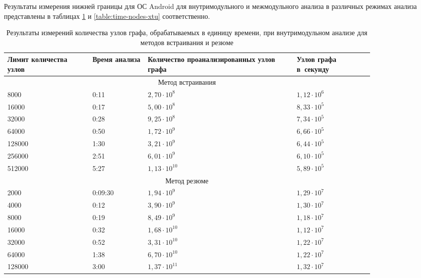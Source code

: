 Результаты измерения нижней границы для ОС Android для внутримодульного и межмодульного анализа в различных режимах анализа представлены в таблицах \ref{table:time-nodes-single} и \ref{table:time-nodes-xtu} соответственно.

\begin{table}
\renewcommand{\arraystretch}{1.2}
\begin{tabular}{| p{0.2\linewidth} | p{0.13\linewidth} | p{0.35\linewidth} | p{0.18\linewidth} |} 
\hline
Лимит количества узлов & Время анализа & Количество проанализированных узлов графа & Узлов графа в~секунду \\
\hline
\multicolumn{4}{|c|}{Метод встраивания} \\
\hline
\hline
8000      &   0:11       & $2,70 \cdot 10^8$  & $1,12 \cdot 10^6$ \\
\hline
16000     &   0:17       & $5,00 \cdot 10^8$  & $8,33 \cdot 10^5$ \\
\hline
32000     &   0:28       & $9,25 \cdot 10^8$  & $7,34 \cdot 10^5$ \\
\hline
64000     &   0:50       & $1,72 \cdot 10^9$  & $6,66 \cdot 10^5$ \\
\hline
128000    &   1:30       & $3,21 \cdot 10^9$  & $6,44 \cdot 10^5$ \\
\hline
256000    &   2:51       & $6,01 \cdot 10^9$  & $6,10 \cdot 10^5$ \\
\hline
512000    &   5:27       & $1,13 \cdot 10^{10}$  & $5,89 \cdot 10^5$ \\
\hline
\hline
\multicolumn{4}{|c|}{Метод резюме} \\
\hline
\hline
2000      &   0:09:30       & $1,94 \cdot 10^9$  & $1,29 \cdot 10^7$ \\
\hline
4000      &   0:12       & $3,90 \cdot 10^9$  & $1,30 \cdot 10^7$ \\
\hline
8000      &   0:19       & $8,49 \cdot 10^9$  & $1,18 \cdot 10^7$ \\
\hline
16000     &   0:32       & $1,68 \cdot 10^{10}$  & $1,12 \cdot 10^7$ \\
\hline
32000     &   0:52       & $3,31 \cdot 10^{10}$  & $1,22 \cdot 10^7$ \\
\hline
64000     &   1:38       & $6,70 \cdot 10^{10}$  & $1,22 \cdot 10^7$ \\
\hline
128000    &   3:00       & $1,37 \cdot 10^{11}$  & $1,32 \cdot 10^7$ \\
\hline
\hline

\end{tabular}
\caption{Результаты измерений количества узлов графа, обрабатываемых в единицу времени, при внутримодульном анализе для методов встраивания и резюме} \label{table:time-nodes-single}
\end{table}




